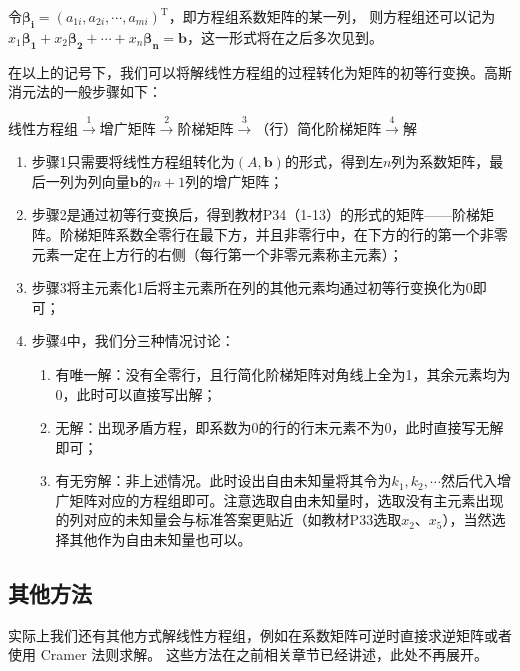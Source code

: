 令$\bm{\beta_i}=(a_{1i},a_{2i},\cdots,a_{mi})^\mathrm{T}$，即方程组系数矩阵的某一列，
则方程组还可以记为$x_1\bm{\beta_1}+x_2\bm{\beta_2}+\cdots+x_n\bm{\beta_n}=\bm{b}$，这一形式将在之后多次见到。

在以上的记号下，我们可以将解线性方程组的过程转化为矩阵的初等行变换。高斯消元法的一般步骤如下：

\centerline{线性方程组$\overset{1}{\longrightarrow}$增广矩阵$\overset{2}{\longrightarrow}$阶梯矩阵$\overset{3}{\longrightarrow}$（行）简化阶梯矩阵$\overset{4}{\longrightarrow}$解}

\begin{enumerate}
	\item 步骤1只需要将线性方程组转化为$(A, \bm{b})$的形式，得到左$n$列为系数矩阵，最后一列为列向量$\bm{b}$的$n+1$列的增广矩阵；
	\item 步骤2是通过初等行变换后，得到教材P34（1-13）的形式的矩阵——阶梯矩阵。阶梯矩阵系数全零行在最下方，并且非零行中，在下方的行的第一个非零元素一定在上方行的右侧（每行第一个非零元素称主元素）；
	\item 步骤3将主元素化1后将主元素所在列的其他元素均通过初等行变换化为0即可；
	\item 步骤4中，我们分三种情况讨论：
	\begin{enumerate}
		\item 有唯一解：没有全零行，且行简化阶梯矩阵对角线上全为1，其余元素均为0，此时可以直接写出解；
		\item 无解：出现矛盾方程，即系数为0的行的行末元素不为0，此时直接写无解即可；
		\item 有无穷解：非上述情况。此时设出自由未知量将其令为$k_1,k_2,\cdots$然后代入增广矩阵对应的方程组即可。注意选取自由未知量时，选取没有主元素出现的列对应的未知量会与标准答案更贴近（如教材P33选取$x_2$、$x_5$），当然选择其他作为自由未知量也可以。
	\end{enumerate}
\end{enumerate}

\subsection{其他方法}
实际上我们还有其他方式解线性方程组，例如在系数矩阵可逆时直接求逆矩阵或者使用 Cramer 法则求解。
这些方法在之前相关章节已经讲述，此处不再展开。

